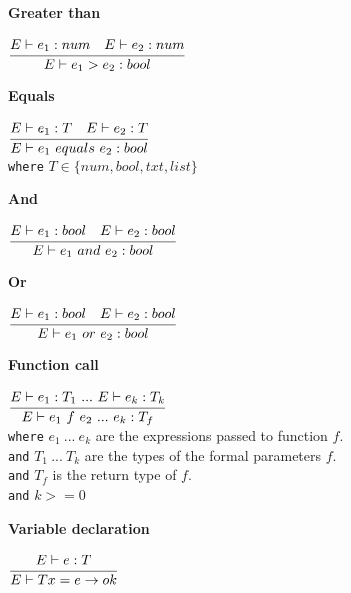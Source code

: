 \textbf{Greater than}\\
\begin{center}
	\begin{math}
	\cfrac
	{E \vdash e_1: num \quad E \vdash e_2: num}
	{E \vdash e_1 > e_2 : bool}
	\end{math}
\end{center}

\textbf{Equals}\\
\begin{center}
	\begin{math}
	\cfrac
	{E \vdash e_1: T \quad E \vdash e_2: T}
	{E \vdash e_1\ equals\ e_2 : bool}
	\end{math}\\[1\baselineskip]
	\texttt{where} $T \in \{num, bool, txt, list\}$
\end{center}

\textbf{And}\\
\begin{center}
	\begin{math}
	\cfrac
	{E \vdash e_1: bool \quad E \vdash e_2: bool}
	{E \vdash e_1\ and\ e_2 : bool}
	\end{math}
\end{center}

\textbf{Or}\\
\begin{center}
	\begin{math}
	\cfrac
	{E \vdash e_1: bool \quad E \vdash e_2: bool}
	{E \vdash e_1\ or\ e_2 : bool}
	\end{math}
\end{center}

\textbf{Function call}\\
\begin{center}
	\begin{math}
	\cfrac
	{E \vdash e_1 : T_1 \ .
	.
	.
	\ E \vdash e_k : T_k}
	{E \vdash e_1\ f\ e_2 \ .
	.
	.
	\ e_k : T_f}
	\end{math}
	\\[1\baselineskip]
	\texttt{where} $e_1\ .
	.
	.
	\ e_k$ are the expressions passed to function $f$.
	\\
	\texttt{and} $T_1\ .
	.
	.
	\ T_k$ are the types of the formal parameters $f$.
	\\
	\texttt{and} $T_f$ is the return type of $f$.
	\\
	\texttt{and} $k >= 0$
\end{center}

\textbf{Variable declaration}\\
\begin{center}
	\begin{math}
		\cfrac
		{E \vdash e : T}
		{E \vdash T x = e \rightarrow ok}
	\end{math}
\end{center}

